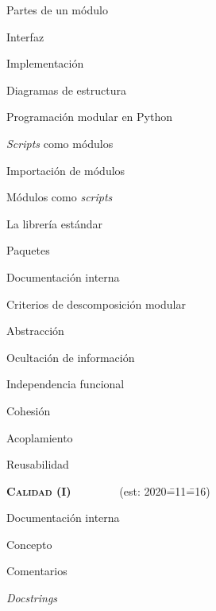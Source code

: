 \begin{longenum}
\begin{longenum}
\begin{longenum}
            \item Partes de un módulo
            \begin{longenum}
                \item Interfaz
                \item Implementación
            \end{longenum}
            \item Diagramas de estructura
        \end{longenum}
        \item Programación modular en Python
        \begin{longenum}
            \item \textit{Scripts} como módulos
            \item Importación de módulos
            \item Módulos como \textit{scripts}
            \item La librería estándar
            \item Paquetes \opcional\
            \item Documentación interna \opcional\
        \end{longenum}
        \item Criterios de descomposición modular
        \begin{longenum}
            \item Abstracción
            \item Ocultación de información
            \item Independencia funcional
            \begin{longenum}
                \item Cohesión
                \item Acoplamiento
            \end{longenum}
            \item Reusabilidad
        \end{longenum}
    \end{longenum}
    \item \textbf{\textsc{Calidad (I)}} \ \ \ \ \ \ \ \ (est: 2020\==11\==16)
    \begin{longenum}
        \item Documentación interna
        \begin{longenum}
            \item Concepto
            \item Comentarios
            \item \textit{Docstrings}

\end{longenum}
\end{longenum}
\end{longenum}
